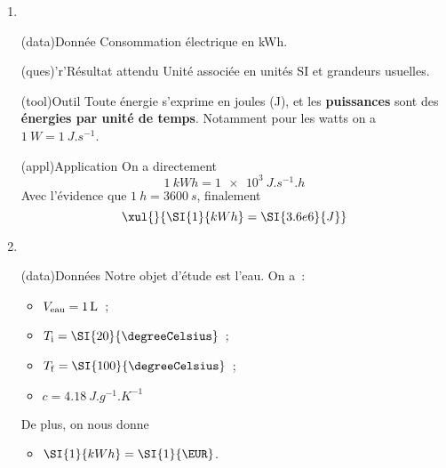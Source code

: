 \documentclass[../main/main.tex]{subfiles}
\begin{document}
{
	\begin{enumerate}
		\item ~
		      \begin{tcbraster}[raster columns=2]
			      \begin{tcb}[](data){Donnée}
				      Consommation électrique en \si{kWh}.
			      \end{tcb}
			      \begin{tcb}(ques)'r'{Résultat attendu}
				      Unité associée en unités SI et grandeurs usuelles.
			      \end{tcb}
		      \end{tcbraster}
		      \begin{tcb}(tool){Outil}
			      Toute énergie s'exprime en joules (J), et les \textbf{puissances}
			      sont des \textbf{énergies par unité de temps}. Notamment pour les
			      watts on a $\SI{1}{W} = \SI{1}{J.s^{-1}}$.
		      \end{tcb}
		      \begin{tcb}(appl){Application}
			      On a directement
			      \[ \SI{1}{kWh} = \SI{1e3}{J.s^{-1}.h}\]
			      Avec l'évidence que $ \SI{1}{h} = \SI{3600}{s}$, finalement
			      \[\xul{}{\SI{1}{kWh} = \SI{3.6e6}{J}}\]
		      \end{tcb}
		\item ~
		      \begin{tcbraster}[raster columns=2, raster equal height=rows]
			      \begin{tcb}[](data){Données}
				      Notre objet d'étude est l'eau. On a~:
				      \begin{itemize}
					      \item $V_{\rm eau} = \SI{1}{L}$~;
					      \item $T_{\rm i} = \SI{20}{\degreeCelsius}$~;
					      \item $T_{\rm f} = \SI{100}{\degreeCelsius}$~;
					      \item $c = \SI{4.18}{J.g^{-1}.K^{-1}}$
				      \end{itemize}
				      De plus, on nous donne
				      \begin{itemize}
					      \item $ \SI{1}{kWh} = \SI{1}{\EUR}$.
				      \end{itemize}
			      \end{tcb}
			      \begin{tcolorbox}[blankest, raster multicolumn=1, space to=\myspace]
				      \begin{tcbraster}[raster columns=1]

\end{tcbraster}
\end{tcolorbox}
\end{tcbraster}
\end{enumerate}}
\end{document}
